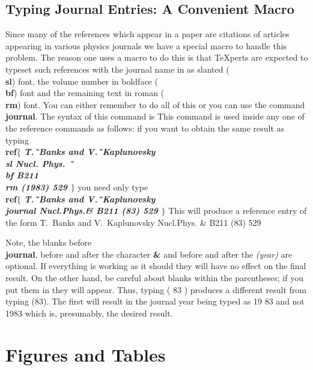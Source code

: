 \subsection{Typing Journal Entries: A Convenient Macro }
 
Since many of the references which appear in a paper are
citations of articles appearing in various physics journals
we have a special macro to handle this problem.
The reason one uses a macro to do this is that \TeX perts
are expected to typeset such references with the journal name
in as slanted ({\bf \\sl}) font, the volume number in boldface
({\bf \\bf}) font and the remaining text in roman ({\bf \\rm}) font.
You can either remember to do all of this or you can use the
command {\bf \\journal}.
The syntax of this command is
This command is used inside any
one of the reference commands as follows:
if you want to obtain the same result as typing \nextline
{\bf \\ref$\{$ \it T.\~\ Banks and V.\~\ Kaplunovsky \bf \\sl
\it Nucl. Phys. \bf \~\
\\bf \it B211 \bf \\rm \it (1983) 529 \bf $\}$} \nextline
you need only type \nextline
{\bf \\ref$\{$ \it T.\~\ Banks and V.\~\ Kaplunovsky \bf
\\journal \it Nucl.Phys.\bf \& \it B211 (83) 529 $\}$}
This will produce a reference entry of the form \nextline
{} T.~Banks and V.~Kaplunovsky \journal Nucl.Phys. & B211 (83)
529
 
Note, the blanks before {\bf \\journal}, before and after the
character {\bf \&} and before and after the {\it (year)} are
optional.
If everything is working as it should they will have no effect
on the final result.
On the other hand, be careful about blanks within the parentheses;
if you put them in they will appear.
Thus, typing ( 83 ) produces a different result from typing (83).
The first will result in the journal year being typed as 19 83
and not 1983 which is, presumably, the desired result.
 
\section{Figures and Tables}
 
